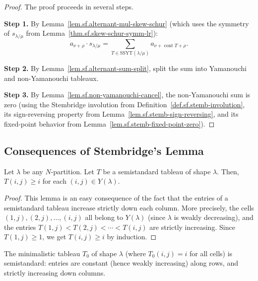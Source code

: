\begin{proof}
\leanok
The proof proceeds in several steps.

\textbf{Step 1.} By Lemma~\ref{lem.sf.alternant-mul-skew-schur}
(which uses the symmetry of $s_{\lambda/\mu}$ from
Lemma~\ref{thm.sf.skew-schur-symm-lr}):
\[
a_{\nu+\rho} \cdot s_{\lambda/\mu}
= \sum_{T \in \mathrm{SSYT}(\lambda/\mu)} a_{\nu + \operatorname{cont} T + \rho}.
\]

\textbf{Step 2.} By Lemma~\ref{lem.sf.alternant-sum-split}, split the sum into
Yamanouchi and non-Yamanouchi tableaux.

\textbf{Step 3.} By Lemma~\ref{lem.sf.non-yamanouchi-cancel}, the non-Yamanouchi
sum is zero (using the Stembridge involution from
Definition~\ref{def.sf.stemb-involution}, its sign-reversing property from
Lemma~\ref{lem.sf.stemb-sign-reversing}, and its fixed-point behavior from
Lemma~\ref{lem.sf.stemb-fixed-point-zero}).
\end{proof}

\subsection{Consequences of Stembridge's Lemma}

\begin{lemma}
\label{lem.sf.tab-greater-i}
\leantarget
\leanok
Let $\lambda$ be any $N$-partition. Let $T$ be a
semistandard tableau of shape $\lambda$. Then, $T\left(  i,j\right)  \geq i$
for each $\left(  i,j\right)  \in Y\left(  \lambda\right)  $.
\end{lemma}

\begin{proof}
\leanok
This lemma is an easy consequence
of the fact that the entries of a semistandard tableau increase strictly down
each column. More precisely, the cells
$(1, j), (2, j), \ldots, (i, j)$ all belong to $Y(\lambda)$ (since $\lambda$
is weakly decreasing), and the entries $T(1, j) < T(2, j) < \cdots < T(i, j)$
are strictly increasing. Since $T(1, j) \geq 1$, we get $T(i, j) \geq i$ by
induction.
\end{proof}

\begin{lemma}
\label{lem.sf.minimalistic-semistandard}
\leanhelper
\leanok
The minimalistic tableau $T_0$ of shape $\lambda$ (where $T_0(i,j) = i$
for all cells) is semistandard: entries are constant (hence weakly increasing)
along rows, and strictly increasing down columns.
\end{lemma}

